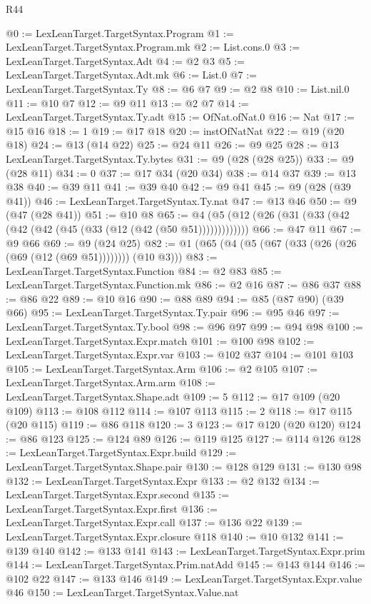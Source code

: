 \begin{lexlean}{R44}
\begin{coremodule}
@0 := LexLeanTarget.TargetSyntax.Program
@1 := LexLeanTarget.TargetSyntax.Program.mk
@2 := List.cons.{0}
@3 := LexLeanTarget.TargetSyntax.Adt
@4 := @2 @3
@5 := LexLeanTarget.TargetSyntax.Adt.mk
@6 := List.{0}
@7 := LexLeanTarget.TargetSyntax.Ty
@8 := @6 @7
@9 := @2 @8
@10 := List.nil.{0}
@11 := @10 @7
@12 := @9 @11
@13 := @2 @7
@14 := LexLeanTarget.TargetSyntax.Ty.adt
@15 := OfNat.ofNat.{0}
@16 := Nat
@17 := @15 @16
@18 := 1
@19 := @17 @18
@20 := instOfNatNat
@22 := @19 (@20 @18)
@24 := @13 (@14 @22)
@25 := @24 @11
@26 := @9 @25
@28 := @13 LexLeanTarget.TargetSyntax.Ty.bytes
@31 := @9 (@28 (@28 @25))
@33 := @9 (@28 @11)
@34 := 0
@37 := @17 @34 (@20 @34)
@38 := @14 @37
@39 := @13 @38
@40 := @39 @11
@41 := @39 @40
@42 := @9 @41
@45 := @9 (@28 (@39 @41))
@46 := LexLeanTarget.TargetSyntax.Ty.nat
@47 := @13 @46
@50 := @9 (@47 (@28 @41))
@51 := @10 @8
@65 := @4 (@5 (@12 (@26 (@31 (@33 (@42 (@42 (@42 (@45 (@33 (@12 (@42 (@50 @51)))))))))))))
@66 := @47 @11
@67 := @9 @66
@69 := @9 (@24 @25)
@82 := @1 (@65 (@4 (@5 (@67 (@33 (@26 (@26 (@69 (@12 (@69 @51)))))))) (@10 @3)))
@83 := LexLeanTarget.TargetSyntax.Function
@84 := @2 @83
@85 := LexLeanTarget.TargetSyntax.Function.mk
@86 := @2 @16
@87 := @86 @37
@88 := @86 @22
@89 := @10 @16
@90 := @88 @89
@94 := @85 (@87 @90) (@39 @66)
@95 := LexLeanTarget.TargetSyntax.Ty.pair
@96 := @95 @46
@97 := LexLeanTarget.TargetSyntax.Ty.bool
@98 := @96 @97
@99 := @94 @98
@100 := LexLeanTarget.TargetSyntax.Expr.match
@101 := @100 @98
@102 := LexLeanTarget.TargetSyntax.Expr.var
@103 := @102 @37
@104 := @101 @103
@105 := LexLeanTarget.TargetSyntax.Arm
@106 := @2 @105
@107 := LexLeanTarget.TargetSyntax.Arm.arm
@108 := LexLeanTarget.TargetSyntax.Shape.adt
@109 := 5
@112 := @17 @109 (@20 @109)
@113 := @108 @112
@114 := @107 @113
@115 := 2
@118 := @17 @115 (@20 @115)
@119 := @86 @118
@120 := 3
@123 := @17 @120 (@20 @120)
@124 := @86 @123
@125 := @124 @89
@126 := @119 @125
@127 := @114 @126
@128 := LexLeanTarget.TargetSyntax.Expr.build
@129 := LexLeanTarget.TargetSyntax.Shape.pair
@130 := @128 @129
@131 := @130 @98
@132 := LexLeanTarget.TargetSyntax.Expr
@133 := @2 @132
@134 := LexLeanTarget.TargetSyntax.Expr.second
@135 := LexLeanTarget.TargetSyntax.Expr.first
@136 := LexLeanTarget.TargetSyntax.Expr.call
@137 := @136 @22
@139 := LexLeanTarget.TargetSyntax.Expr.closure @118
@140 := @10 @132
@141 := @139 @140
@142 := @133 @141
@143 := LexLeanTarget.TargetSyntax.Expr.prim
@144 := LexLeanTarget.TargetSyntax.Prim.natAdd
@145 := @143 @144
@146 := @102 @22
@147 := @133 @146
@149 := LexLeanTarget.TargetSyntax.Expr.value @46
@150 := LexLeanTarget.TargetSyntax.Value.nat

\end{coremodule}
\end{lexlean}
